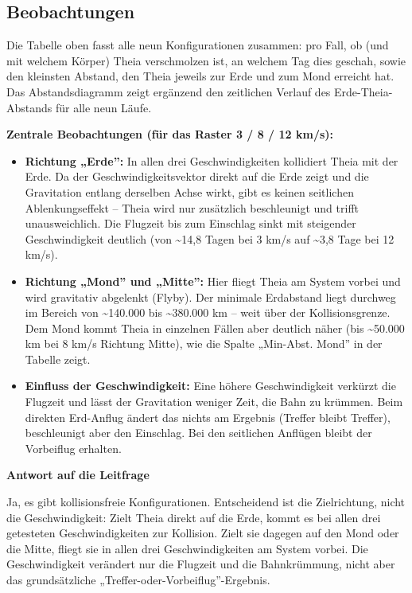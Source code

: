 \documentclass[11pt]{article}
\begin{document}
    \subsection{Beobachtungen}\label{beobachtungen}

Die Tabelle oben fasst alle neun Konfigurationen zusammen: pro Fall, ob
(und mit welchem Körper) Theia verschmolzen ist, an welchem Tag dies
geschah, sowie den kleinsten Abstand, den Theia jeweils zur Erde und zum
Mond erreicht hat. Das Abstandsdiagramm zeigt ergänzend den zeitlichen
Verlauf des Erde-Theia-Abstands für alle neun Läufe.

\textbf{Zentrale Beobachtungen (für das Raster 3 / 8 / 12 km/s):}

\begin{itemize}
\item
  \textbf{Richtung „Erde'':} In allen drei Geschwindigkeiten kollidiert
  Theia mit der Erde. Da der Geschwindigkeitsvektor direkt auf die Erde
  zeigt und die Gravitation entlang derselben Achse wirkt, gibt es
  keinen seitlichen Ablenkungseffekt -- Theia wird nur zusätzlich
  beschleunigt und trifft unausweichlich. Die Flugzeit bis zum Einschlag
  sinkt mit steigender Geschwindigkeit deutlich (von \textasciitilde14,8
  Tagen bei 3 km/s auf \textasciitilde3,8 Tage bei 12 km/s).
\item
  \textbf{Richtung „Mond'' und „Mitte'':} Hier fliegt Theia am System
  vorbei und wird gravitativ abgelenkt (Flyby). Der minimale Erdabstand
  liegt durchweg im Bereich von \textasciitilde140.000 bis
  \textasciitilde380.000 km -- weit über der Kollisionsgrenze. Dem Mond
  kommt Theia in einzelnen Fällen aber deutlich näher (bis
  \textasciitilde50.000 km bei 8 km/s Richtung Mitte), wie die Spalte
  „Min-Abst. Mond'' in der Tabelle zeigt.
\item
  \textbf{Einfluss der Geschwindigkeit:} Eine höhere Geschwindigkeit
  verkürzt die Flugzeit und lässt der Gravitation weniger Zeit, die Bahn
  zu krümmen. Beim direkten Erd-Anflug ändert das nichts am Ergebnis
  (Treffer bleibt Treffer), beschleunigt aber den Einschlag. Bei den
  seitlichen Anflügen bleibt der Vorbeiflug erhalten.
\end{itemize}

\textbf{Antwort auf die Leitfrage}

Ja, es gibt kollisionsfreie Konfigurationen. Entscheidend ist die
Zielrichtung, nicht die Geschwindigkeit: Zielt Theia direkt auf die
Erde, kommt es bei allen drei getesteten Geschwindigkeiten zur
Kollision. Zielt sie dagegen auf den Mond oder die Mitte, fliegt sie in
allen drei Geschwindigkeiten am System vorbei. Die Geschwindigkeit
verändert nur die Flugzeit und die Bahnkrümmung, nicht aber das
grundsätzliche „Treffer-oder-Vorbeiflug''-Ergebnis.
\end{document}
